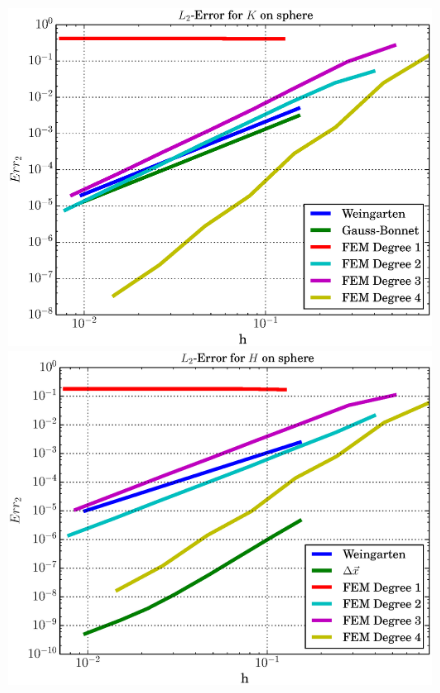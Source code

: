   \begin{figure}
    \begin{minipage}[t]{0.49\textwidth}
       \centering\includegraphics[width=\textwidth]{bilder/Curvature/sphere/ErrKL2.eps}
    \end{minipage}\hfill
    \begin{minipage}[t]{0.49\textwidth}
       \centering\includegraphics[width=\textwidth]{bilder/Curvature/sphere/ErrHL2.eps}
    \end{minipage}\\
    \begin{minipage}[t]{0.49\textwidth}

\end{minipage}
\end{figure}
